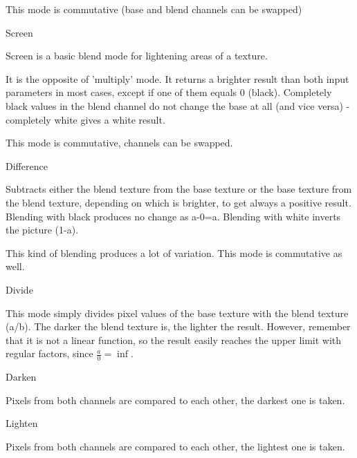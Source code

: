 This mode is commutative (base and blend channels can be swapped)

Screen

Screen is a basic blend mode for lightening areas of a texture.

It is the opposite of 'multiply' mode. It returns a brighter result than both input parameters in most cases, except if one of them equals 0 (black). Completely black values in the blend channel do not change the base at all (and vice versa) - completely white gives a white result.

This mode is commutative, channels can be swapped.

Difference

Subtracts either the blend texture from the base texture or the base texture from the blend texture, depending on which is brighter, to get always a positive result. Blending with black produces no change as a-0=a. Blending with white inverts the picture (1-a).

This kind of blending produces a lot of variation. This mode is commutative as well.

Divide

This mode simply divides pixel values of the base texture with the blend texture (a/b). The darker the blend texture is, the lighter the result. However, remember that it is not a linear function, so the result easily reaches the upper limit with regular factors, since $\tfrac{a}{0}=\inf$.

Darken

Pixels from both channels are compared to each other, the darkest one is taken.

Lighten

Pixels from both channels are compared to each other, the lightest one is taken.
